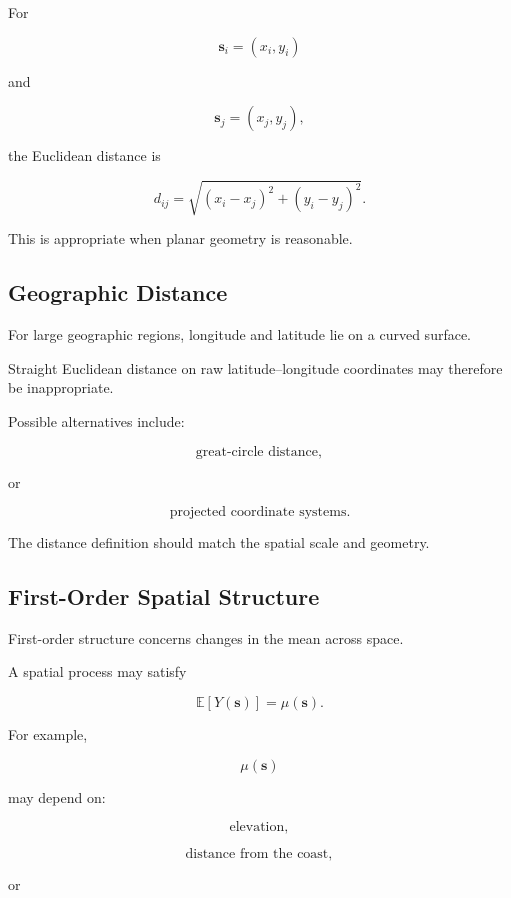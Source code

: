 For

\[
\mathbf{s}_i=(x_i,y_i)
\]

and

\[
\mathbf{s}_j=(x_j,y_j),
\]

the Euclidean distance is

\[
\boxed{
d_{ij}
=
\sqrt{
(x_i-x_j)^2
+
(y_i-y_j)^2
}.
}
\]

This is appropriate when planar geometry is reasonable.

\subsection{Geographic Distance}
\label{subsec:geographic-distance}

For large geographic regions, longitude and latitude lie on a curved
surface.

Straight Euclidean distance on raw latitude--longitude coordinates may
therefore be inappropriate.

Possible alternatives include:

\[
\boxed{
\text{great-circle distance},
}
\]

or

\[
\boxed{
\text{projected coordinate systems}.
}
\]

The distance definition should match the spatial scale and geometry.

\subsection{First-Order Spatial Structure}
\label{subsec:first-order-spatial-structure}

First-order structure concerns changes in the mean across space.

A spatial process may satisfy

\[
\boxed{
\mathbb{E}
[
Y(\mathbf{s})
]
=
\mu(\mathbf{s}).
}
\]

For example,

\[
\mu(\mathbf{s})
\]

may depend on:

\[
\boxed{
\text{elevation},
}
\]

\[
\boxed{
\text{distance from the coast},
}
\]

or

